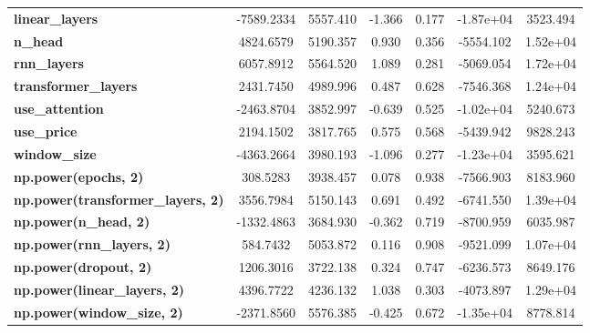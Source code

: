 \begin{center}
\begin{tabular}{lcccccc}
\textbf{linear\_layers}                   &   -7589.2334  &     5557.410     &    -1.366  &         0.177        &    -1.87e+04    &     3523.494     \\
\textbf{n\_head}                          &    4824.6579  &     5190.357     &     0.930  &         0.356        &    -5554.102    &     1.52e+04     \\
\textbf{rnn\_layers}                      &    6057.8912  &     5564.520     &     1.089  &         0.281        &    -5069.054    &     1.72e+04     \\
\textbf{transformer\_layers}              &    2431.7450  &     4989.996     &     0.487  &         0.628        &    -7546.368    &     1.24e+04     \\
\textbf{use\_attention}                   &   -2463.8704  &     3852.997     &    -0.639  &         0.525        &    -1.02e+04    &     5240.673     \\
\textbf{use\_price}                       &    2194.1502  &     3817.765     &     0.575  &         0.568        &    -5439.942    &     9828.243     \\
\textbf{window\_size}                     &   -4363.2664  &     3980.193     &    -1.096  &         0.277        &    -1.23e+04    &     3595.621     \\
\textbf{np.power(epochs, 2)}              &     308.5283  &     3938.457     &     0.078  &         0.938        &    -7566.903    &     8183.960     \\
\textbf{np.power(transformer\_layers, 2)} &    3556.7984  &     5150.143     &     0.691  &         0.492        &    -6741.550    &     1.39e+04     \\
\textbf{np.power(n\_head, 2)}             &   -1332.4863  &     3684.930     &    -0.362  &         0.719        &    -8700.959    &     6035.987     \\
\textbf{np.power(rnn\_layers, 2)}         &     584.7432  &     5053.872     &     0.116  &         0.908        &    -9521.099    &     1.07e+04     \\
\textbf{np.power(dropout, 2)}             &    1206.3016  &     3722.138     &     0.324  &         0.747        &    -6236.573    &     8649.176     \\
\textbf{np.power(linear\_layers, 2)}      &    4396.7722  &     4236.132     &     1.038  &         0.303        &    -4073.897    &     1.29e+04     \\
\textbf{np.power(window\_size, 2)}        &   -2371.8560  &     5576.385     &    -0.425  &         0.672        &    -1.35e+04    &     8778.814     \\

\end{tabular}
\end{center}
